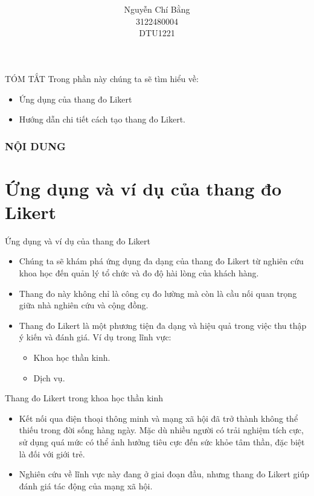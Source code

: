 \documentclass{beamer}
\title[]{\fontsize{13pt}{10pt}\selectfont {\bf \Large ỨNG DỤNG VÀ CÁCH TẠO \\ THANG ĐO LIKERT}\\}
\author[]{ Nguyễn Chí Bằng \\ 3122480004 \\ DTU1221}
\begin{document}
\begin{frame}
\titlepage
\end{frame}

\begin{frame}{TÓM TẮT}
    Trong phần này chúng ta sẽ tìm hiểu về:
    \begin{itemize}
    \item Ứng dụng của thang đo Likert
    \item Hướng dẫn chi tiết cách tạo thang đo Likert.
    \end{itemize}
    \end{frame}    

\begin{frame}
    \frametitle{NỘI DUNG}
    \tableofcontents
\end{frame}    

\section{Ứng dụng và ví dụ của thang đo Likert}
\begin{frame}{Ứng dụng và ví dụ của thang đo Likert}
\begin{itemize}
    \item Chúng ta sẽ khám phá ứng dụng đa dạng của thang đo Likert từ nghiên cứu khoa học đến quản lý tổ chức và đo độ hài lòng của khách hàng. 
    \item Thang đo này không chỉ là công cụ đo lường mà còn là cầu nối quan trọng giữa nhà nghiên cứu và cộng đồng.
    \item Thang đo Likert là một phương tiện đa dạng và hiệu quả trong việc thu thập ý kiến và đánh giá. Ví dụ trong lĩnh vực:
    \begin{itemize}
    \item Khoa học thần kinh.
    \item Dịch vụ.
\end{itemize}
\end{itemize}
\end{frame}

\begin{frame}{Thang đo Likert trong khoa học thần kinh}
    \begin{itemize}
    \item Kết nối qua điện thoại thông minh và mạng xã hội đã trở thành không thể thiếu trong đời sống hàng ngày. Mặc dù nhiều người có trải nghiệm tích cực, sử dụng quá mức có thể ảnh hưởng tiêu cực đến sức khỏe tâm thần, đặc biệt là đối với giới trẻ.
    \item Nghiên cứu về lĩnh vực này đang ở giai đoạn đầu, nhưng thang đo Likert giúp đánh giá tác động của mạng xã hội.
    \end{itemize}
\end{frame}
\end{document}
